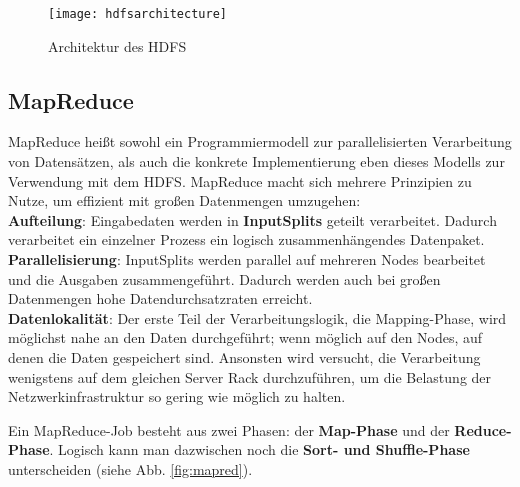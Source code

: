 \begin{figure}[ht]
    \centering
    \texttt{[image: hdfsarchitecture]}
    \caption[Architektur des HDFS]{Architektur des HDFS\parencite[S.69, Figure 3-2]{white_hadoop_2015}}
    \label{fig:hdfs}
\end{figure}

\subsection{MapReduce}
\label{chap:fund sec:core sub:mapred}
MapReduce heißt sowohl ein Programmiermodell zur parallelisierten Verarbeitung von Datensätzen, als auch die konkrete Implementierung eben dieses Modells zur Verwendung mit dem HDFS. MapReduce macht sich mehrere Prinzipien zu Nutze, um effizient mit großen Datenmengen umzugehen\cite{freiknecht_big_2018}: \\
\textbf{Aufteilung}: Eingabedaten werden in \textbf{InputSplits} geteilt verarbeitet. Dadurch verarbeitet ein einzelner Prozess ein logisch zusammenhängendes Datenpaket.\\
\textbf{Parallelisierung}: InputSplits werden parallel auf mehreren Nodes bearbeitet und die Ausgaben zusammengeführt. Dadurch werden auch bei großen Datenmengen hohe Datendurchsatzraten erreicht.\\
\textbf{Datenlokalität}: Der erste Teil der Verarbeitungslogik, die Mapping-Phase, wird möglichst nahe an den Daten durchgeführt; wenn möglich auf den Nodes, auf denen die Daten gespeichert sind. Ansonsten wird versucht, die Verarbeitung wenigstens auf dem gleichen Server Rack durchzuführen, um die Belastung der Netzwerkinfrastruktur so gering wie möglich zu halten.
\par
Ein MapReduce-Job besteht aus zwei Phasen: der \textbf{Map-Phase} und der \textbf{Reduce-Phase}. Logisch kann man dazwischen noch die \textbf{Sort- und Shuffle-Phase} unterscheiden (siehe Abb. \ref*{fig:mapred}).

